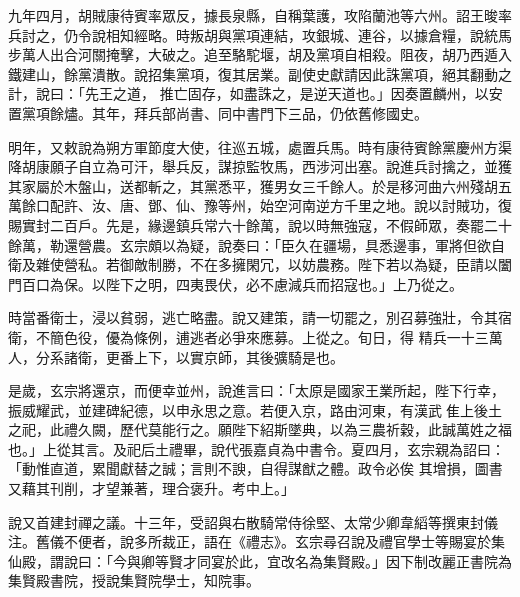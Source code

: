 \begin{pinyinscope}
 九年四月，胡賊康待賓率眾反，據長泉縣，自稱葉護，攻陷蘭池等六州。詔王晙率兵討之，仍令說相知經略。時叛胡與黨項連結，攻銀城、連谷，以據倉糧，說統馬步萬人出合河關掩擊，大破之。追至駱駝堰，胡及黨項自相殺。阻夜，胡乃西遁入鐵建山，餘黨潰散。說招集黨項，復其居業。副使史獻請因此誅黨項，絕其翻動之計，說曰：「先王之道，
 推亡固存，如盡誅之，是逆天道也。」因奏置麟州，以安置黨項餘燼。其年，拜兵部尚書、同中書門下三品，仍依舊修國史。



 明年，又敕說為朔方軍節度大使，往巡五城，處置兵馬。時有康待賓餘黨慶州方渠降胡康願子自立為可汗，舉兵反，謀掠監牧馬，西涉河出塞。說進兵討擒之，並獲其家屬於木盤山，送都斬之，其黨悉平，獲男女三千餘人。於是移河曲六州殘胡五萬餘口配許、汝、唐、鄧、仙、豫等州，始空河南逆方千里之地。說以討賊功，復
 賜實封二百戶。先是，緣邊鎮兵常六十餘萬，說以時無強寇，不假師眾，奏罷二十餘萬，勒還營農。玄宗頗以為疑，說奏曰：「臣久在疆場，具悉邊事，軍將但欲自衛及雜使營私。若御敵制勝，不在多擁閑冗，以妨農務。陛下若以為疑，臣請以闔門百口為保。以陛下之明，四夷畏伏，必不慮減兵而招寇也。」上乃從之。



 時當番衛士，浸以貧弱，逃亡略盡。說又建策，請一切罷之，別召募強壯，令其宿衛，不簡色役，優為條例，逋逃者必爭來應募。上從之。旬日，得
 精兵一十三萬人，分系諸衛，更番上下，以實京師，其後彍騎是也。



 是歲，玄宗將還京，而便幸並州，說進言曰：「太原是國家王業所起，陛下行幸，振威耀武，並建碑紀德，以申永思之意。若便入京，路由河東，有漢武隹上後土之祀，此禮久闕，歷代莫能行之。願陛下紹斯墜典，以為三農祈穀，此誠萬姓之福也。」上從其言。及祀后土禮畢，說代張嘉貞為中書令。夏四月，玄宗親為詔曰：「動惟直道，累聞獻替之誠；言則不諛，自得謀猷之體。政令必俟
 其增損，圖書又藉其刊削，才望兼著，理合褒升。考中上。」



 說又首建封禪之議。十三年，受詔與右散騎常侍徐堅、太常少卿韋縚等撰東封儀注。舊儀不便者，說多所裁正，語在《禮志》。玄宗尋召說及禮官學士等賜宴於集仙殿，謂說曰：「今與卿等賢才同宴於此，宜改名為集賢殿。」因下制改麗正書院為集賢殿書院，授說集賢院學士，知院事。




\end{pinyinscope}
